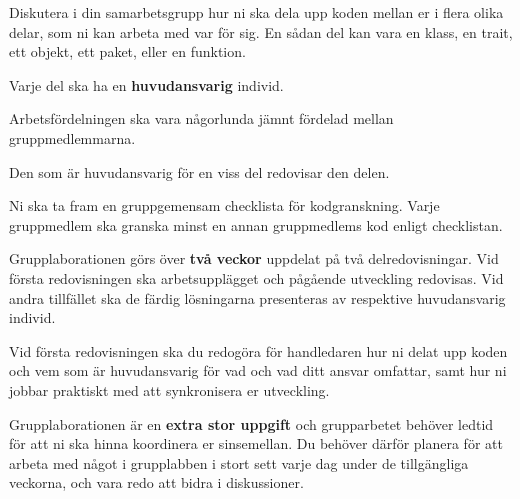 \item
Diskutera i din samarbetsgrupp hur ni ska dela upp koden mellan er i flera olika delar, som ni kan arbeta med var för sig. En sådan del kan vara en klass, en trait, ett objekt, ett paket, eller en funktion.
\item
Varje del ska ha en \textbf{huvudansvarig} individ.
\item
Arbetsfördelningen ska vara någorlunda jämnt fördelad mellan gruppmedlemmarna.
\item
Den som är huvudansvarig för en viss del redovisar den delen.
\item 
Ni ska ta fram en gruppgemensam checklista för kodgranskning. Varje gruppmedlem ska granska minst en annan gruppmedlems kod enligt checklistan. 
\item
Grupplaborationen görs över \textbf{två veckor} uppdelat på två delredovisningar. Vid första redovisningen ska arbetsupplägget och pågående utveckling redovisas. Vid andra tillfället ska de färdig lösningarna presenteras av respektive huvudansvarig individ.
\item
Vid första redovisningen ska du redogöra för handledaren hur ni delat upp koden och vem som är huvudansvarig för vad och vad ditt ansvar omfattar, samt hur ni jobbar praktiskt med att synkronisera er utveckling.
\item Grupplaborationen är en \textbf{extra stor uppgift} och grupparbetet behöver ledtid för att ni ska hinna koordinera er sinsemellan. Du behöver därför planera för att arbeta med något i grupplabben i stort sett varje dag under de tillgängliga veckorna, och vara redo att bidra i diskussioner.

